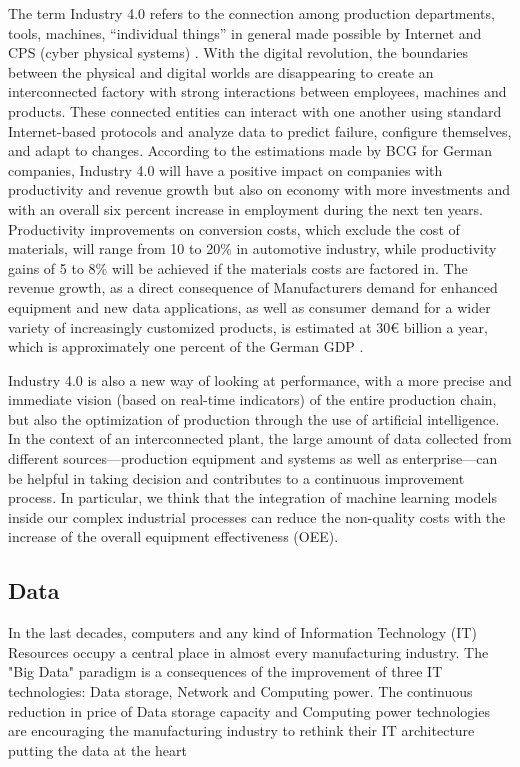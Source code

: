 The term Industry 4.0 refers to the connection among production departments, tools, machines, “individual things” in general made possible by Internet and CPS (cyber physical systems) \citep{schlapfer2015industry} .
With the digital revolution, the boundaries between the physical and digital worlds are disappearing to create an interconnected factory with strong interactions between employees, machines and products. These connected entities can interact with one another using standard Internet-based protocols and analyze data to predict failure, configure themselves, and adapt to changes.
According to the estimations made by BCG for German companies, Industry 4.0 will have a positive impact on companies with productivity and revenue growth but also on economy with more investments and with an overall six percent increase in employment during the next ten years. Productivity improvements on conversion costs, which exclude the cost of materials, will range from 10 to 20\% in automotive industry, while productivity gains of 5 to 8\% will be achieved if the materials costs are factored in. 
The revenue growth, as a direct consequence of  Manufacturers demand for enhanced equipment and new data applications, as well as consumer demand for a wider variety of increasingly customized products, is estimated at 30€ billion a year, which is approximately one percent of the German GDP \citep{russmann2015industry}. 

Industry 4.0 is also a new way of looking at performance, with a more precise and immediate vision (based on real-time indicators) of the entire production chain, but also the optimization of production through the use of artificial intelligence. In the context of an interconnected plant, the large amount of data collected from different sources—production equipment and systems as well as enterprise—can be helpful in taking decision and contributes to a continuous improvement process. In particular, we think that the integration of machine learning models inside our complex industrial processes can reduce the non-quality costs with the increase of the overall equipment effectiveness (OEE). 


\subsection{Data}

In the last decades, computers and any kind of Information Technology (IT) Resources occupy a central place in almost every manufacturing industry. The "Big Data" paradigm is a consequences of the improvement of three IT technologies: Data storage, Network and Computing power. The continuous reduction in price of Data storage capacity and Computing power technologies are encouraging the manufacturing industry to rethink their IT architecture putting the data at the heart 

